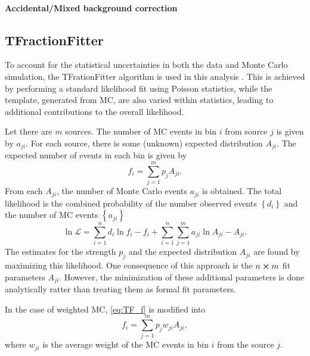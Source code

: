 \documentclass[../main.tex]{subfiles}
\begin{document}
\paragraph{Accidental/Mixed background correction}



\subsection{TFractionFitter}
To account for the statistical uncertainties in both the data and Monte Carlo
simulation, the TFrationFitter algorithm is used in this analysis \cite{barlow1993}.
This is achieved by performing a standard likelihood fit using Poisson statistics,
while the template, generated from MC, are also varied within statistics, leading
to additional contributions to the overall likelihood.

Let there are $m$ sources. The number of MC events in bin $i$ from source $j$
is given by $a_{ji}$. For each source, there is some (unknown) expected distribution
$A_{ji}$. The expected number of events in each bin is given by
\begin{equation}
	f_i = \sum^m_{j=1} p_j A_{ji}.
	\label{eq:TF_f}
\end{equation}
From each $A_{ji}$, the number of Monte Carlo events $a_{ji}$ is obtained.
The total likelihood is the combined probability of the number observed events $\left\{d_i\right\}$
and the number of MC events $\left\{a_{ji}\right\}$
\begin{equation}
	\ln \mathcal{L} = \sum^n_{i=1} d_i \ln f_i -f_i + \sum^n_{i=1} \sum^m_{j=1} a_{ji} \ln A_{ji} - A_{ji}.
	\label{eq:TF_likelihood}
\end{equation}
The estimates for the strength $p_j$ and the expected distribution $A_{ji}$ are
found by maximizing this likelihood. One consequence of this approach is the
$n \cross m$ fit parameters $A_{ji}$. However, the  minimization of these additional
parameters is done analytically ratter than treating them as formal fit parameters.

In the case of weighted MC, \cref{eq:TF_f} is modified into
\begin{equation}
	f_i = \sum^m_{j=1} p_j w_{ji}A_{ji},
\end{equation}
where $w_{ji}$ is the average weight of the MC events in bin $i$ from the source $j$.
\end{document}
